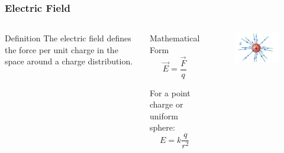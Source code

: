 \documentclass{beamer}
\begin{document}
\begin{frame}
    \frametitle{Electric Field}
    \begin{columns}
        \begin{block}{Definition}
            The electric field defines the force per unit charge in the space around a charge distribution.
        \end{block}
        
        \begin{block}{Mathematical Form}
            \begin{equation}
                \vec{E} = \frac{\vec{F}}{q}
            \end{equation}
            
            For a point charge or uniform sphere:
            \begin{equation}
                E = k\frac{q}{r^2}
            \end{equation}
        \end{block}
        
        \begin{alertblock}{ }
            \begin{figure}
                \centering
                \includegraphics[width=0.75\linewidth]{phys11-electrostatics-field-lines-positive-charge.png}
            \end{figure}
        \end{alertblock}
    \end{columns}
\end{frame}
\end{document}
